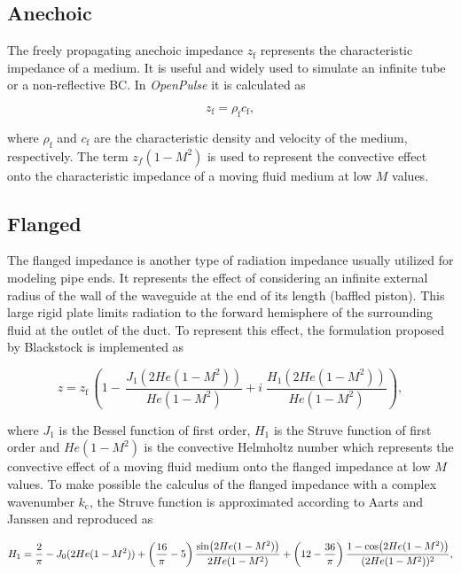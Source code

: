 \documentclass[12pt]{article}
\begin{document}
\subsection{Anechoic}

The freely propagating anechoic impedance $z_{\text{f}}$ represents the characteristic impedance of a medium. It is useful and widely used to simulate an infinite tube or a non-reflective \acrshort{BC}. In \textit{OpenPulse} it is calculated as

\begin{equation}
	z_{\text{f}} = \rho_{\text{f}} c_{\text{f}},
\end{equation}

\noindent where $\rho_{\text{f}}$ and $c_{\text{f}}$ are  the characteristic density and velocity of the medium, respectively. The term $z_f (1 - M^2)$ is used to represent the convective effect onto the characteristic impedance of a moving fluid medium at low $M$ values.

\subsection{Flanged}

The flanged impedance is another type of radiation impedance usually utilized for modeling pipe ends. It represents the effect of considering an infinite external radius of the wall of the waveguide at the end of its length (baffled piston). This large rigid plate limits radiation to the forward hemisphere of the surrounding fluid at the outlet of the duct. To represent this effect, the formulation proposed by Blackstock \cite{blackstock2000fundamentals} is implemented as

\begin{equation} \label{eq:z_flanged}
	z = z_\text{f}  \,\left( 1 -  \, \frac{J_1 (2 He(1 - M^2) ) }{He(1 - M^2) }  + i \; \frac{H_1 (2 He(1 - M^2)) }{ He(1 - M^2) } \right), 
\end{equation}

\noindent where $J_1$ is the Bessel function of first order, $H_1$ is the Struve function of first order and $He(1 - M^2)$ is the convective Helmholtz number which represents the convective effect of a moving fluid medium onto the flanged impedance at low $M$ values. To make possible the calculus of the flanged impedance with a complex wavenumber $k_{\text{c}}$, the Struve function is approximated according to Aarts and Janssen \cite{struvefunction} and reproduced as

\begin{equation} \label{eq:struve_aprox}
	\footnotesize
H_1 = \frac{2}{\pi} - J_0(2 He(1 - M^2) ) + \left( \frac{16}{\pi} - 5 \right) \frac{\sin( 2 He(1 - M^2))}{2 He(1 - M^2) } + \left( 12 - \frac{36}{\pi} \right) \frac{1 - \cos(2 He(1 - M^2) )}{ (2 He(1 - M^2) )^2},
\end{equation}
\end{document}
